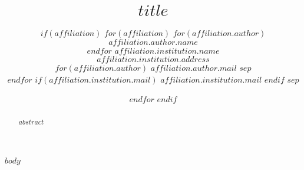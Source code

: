\documentclass[$if(classoption)$$classoption$$else$10pt,twocolumn,letterpaper$endif$]{article}
\begin{document}
\title{$title$}

\author{
$if(affiliation)$
$for(affiliation)$
$for(affiliation.author)$
$affiliation.author.name$\\
$endfor$
$affiliation.institution.name$ \\
$affiliation.institution.address$ \\
$for(affiliation.author)$
{\tt\small $affiliation.author.mail$}
$sep$\\
$endfor$
$if(affiliation.institution.mail)$
{\tt\small $affiliation.institution.mail$}
$endif$
$sep$\and
$endfor$
$endif$
}

\maketitle

\begin{abstract}
   $abstract$
\end{abstract}

$body$

{\small


}
\end{document}

